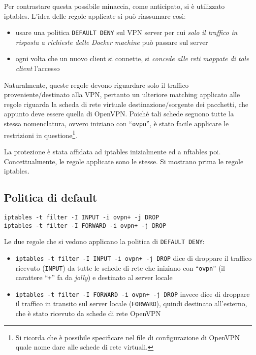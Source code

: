  
Per contrastare questa possibile minaccia, come anticipato, si è utilizzato iptables.
L'idea delle regole applicate si può riassumare così:
\begin{itemize}
	\item usare una politica \texttt{DEFAULT DENY} sul VPN server per cui \textit{solo
		il traffico in risposta a richieste delle Docker machine} può passare sul server
		\item ogni volta che un nuovo client si connette, si \textit{concede alle reti
			mappate di tale client} l'accesso
\end{itemize}
		
Naturalmente, queste regole devono riguardare solo il traffico proveniente/destinato
alla VPN, pertanto un ulteriore matching applicato alle regole riguarda la scheda di
rete virtuale destinazione/sorgente dei pacchetti, che appunto deve essere quella
di OpenVPN. Poiché tali schede seguono tutte la stessa nomenclatura, ovvero iniziano con
``\texttt{ovpn}'', è stato facile applicare le restrizioni in questione\footnote{Si ricorda che
è possibile specificare nel file di configurazione di OpenVPN quale nome dare alle schede di rete
virtuali.}.

La protezione è stata affidata ad iptables inizialmente ed a nftables poi. Concettualmente,
le regole applicate sono le stesse. Si mostrano prima le regole iptables.
		
\subsection{Politica di default}
		
\begin{verbatim}
iptables -t filter -I INPUT -i ovpn+ -j DROP
iptables -t filter -I FORWARD -i ovpn+ -j DROP
\end{verbatim}
		
		Le due regole che si vedono applicano la politica di \texttt{DEFAULT DENY}:
		\begin{itemize}
			\item \texttt{iptables -t filter -I INPUT -i ovpn+ -j DROP} dice di droppare
			      il traffico ricevuto (\texttt{INPUT})
			      da tutte le schede di rete che iniziano con ``\texttt{ovpn}''
			      (il carattere ``\texttt{+}'' fa da \textit{jolly}) e destinato al server locale
			\item \texttt{iptables -t filter -I FORWARD -i ovpn+ -j DROP} invece dice
			      di droppare il traffico in transito sul server locale (\texttt{FORWARD}), quindi
			      destinato all'esterno,
			      che è stato ricevuto da schede di rete OpenVPN
		\end{itemize}
		
